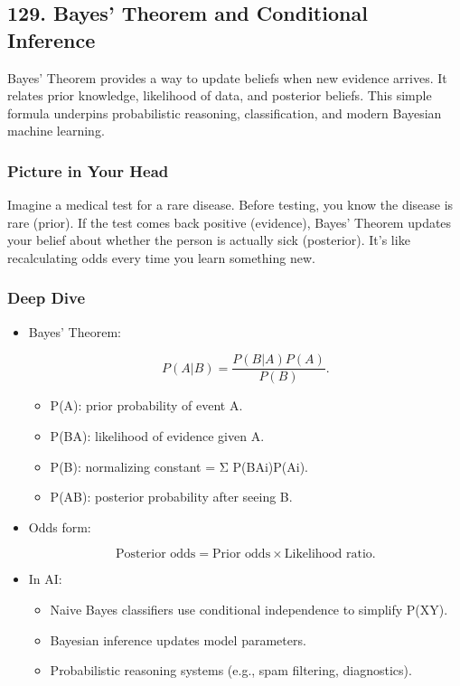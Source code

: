 \documentclass[
  letterpaper,
  DIV=11,
  numbers=noendperiod]{scrreprt}
\providecommand{\tightlist}{%
  \setlength{\itemsep}{0pt}\setlength{\parskip}{0pt}}
\begin{document}
\subsection{129. Bayes' Theorem and Conditional
Inference}\label{bayes-theorem-and-conditional-inference}

Bayes' Theorem provides a way to update beliefs when new evidence
arrives. It relates prior knowledge, likelihood of data, and posterior
beliefs. This simple formula underpins probabilistic reasoning,
classification, and modern Bayesian machine learning.

\subsubsection{Picture in Your Head}\label{picture-in-your-head-128}

Imagine a medical test for a rare disease. Before testing, you know the
disease is rare (prior). If the test comes back positive (evidence),
Bayes' Theorem updates your belief about whether the person is actually
sick (posterior). It's like recalculating odds every time you learn
something new.

\subsubsection{Deep Dive}\label{deep-dive-128}

\begin{itemize}
\item
  Bayes' Theorem:

  \[
  P(A|B) = \frac{P(B|A)P(A)}{P(B)}.
  \]

  \begin{itemize}
  \tightlist
  \item
    P(A): prior probability of event A.
  \item
    P(B\textbar A): likelihood of evidence given A.
  \item
    P(B): normalizing constant = Σ P(B\textbar Ai)P(Ai).
  \item
    P(A\textbar B): posterior probability after seeing B.
  \end{itemize}
\item
  Odds form:

  \[
  \text{Posterior odds} = \text{Prior odds} \times \text{Likelihood ratio}.
  \]
\item
  In AI:

  \begin{itemize}
  \tightlist
  \item
    Naive Bayes classifiers use conditional independence to simplify
    P(X\textbar Y).
  \item
    Bayesian inference updates model parameters.
  \item
    Probabilistic reasoning systems (e.g., spam filtering, diagnostics).
  \end{itemize}
\end{itemize}
\end{document}
